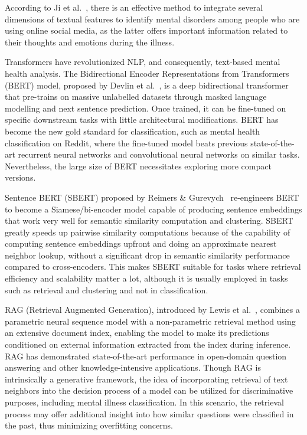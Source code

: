\documentclass[11pt]{article}
\begin{document}
According to Ji et al.~\cite{ji2022}, there is an effective method to integrate several dimensions of textual features to identify mental disorders among people who are using online social media, as the latter offers important information related to their thoughts and emotions during the illness.

Transformers have revolutionized NLP, and consequently, text-based mental health analysis. The Bidirectional Encoder Representations from Transformers (BERT) model, proposed by Devlin et al.~\cite{devlin2019}, is a deep bidirectional transformer that pre-trains on massive unlabelled datasets through masked language modelling and next sentence prediction. Once trained, it can be fine-tuned on specific downstream tasks with little architectural modifications. BERT has become the new gold standard for classification, such as mental health classification on Reddit, where the fine-tuned model beats previous state-of-the-art recurrent neural networks and convolutional neural networks on similar tasks. Nevertheless, the large size of BERT necessitates exploring more compact versions.

Sentence BERT (SBERT) proposed by Reimers \& Gurevych~\cite{reimers2019} re-engineers BERT to become a Siamese/bi-encoder model capable of producing sentence embeddings that work very well for semantic similarity computation and clustering. SBERT greatly speeds up pairwise similarity computations because of the capability of computing sentence embeddings upfront and doing an approximate nearest neighbor lookup, without a significant drop in semantic similarity performance compared to cross-encoders. This makes SBERT suitable for tasks where retrieval efficiency and scalability matter a lot, although it is usually employed in tasks such as retrieval and clustering and not in classification.

RAG (Retrieval Augmented Generation), introduced by Lewis et al.~\cite{lewis2020}, combines a parametric neural sequence model with a non-parametric retrieval method using an extensive document index, enabling the model to make its predictions conditioned on external information extracted from the index during inference. RAG has demonstrated state-of-the-art performance in open-domain question answering and other knowledge-intensive applications. Though RAG is intrinsically a generative framework, the idea of incorporating retrieval of text neighbors into the decision process of a model can be utilized for discriminative purposes, including mental illness classification. In this scenario, the retrieval process may offer additional insight into how similar questions were classified in the past, thus minimizing overfitting concerns.
\end{document}
